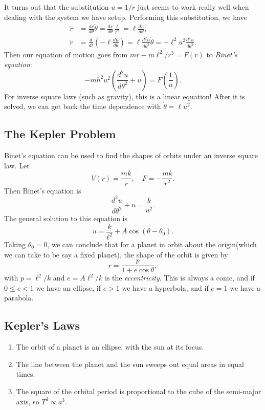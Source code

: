 \documentclass[11pt, a4paper]{scrartcl}
\theoremstyle{definition}
\begin{document}
It turns out that the substitution $u = 1/r$ just seems to work really well when dealing with the system we have setup. Performing this substitution, we have
\begin{align*}
	\dot{r} &= \frac{dr}{d \theta} \dot{\theta} = \frac{dr}{d\theta} \frac{\ell}{r^2} = \ell \frac{du}{d \theta}, \\
	\ddot{r} &= \frac{d}{dt}\left(- \ell \frac{du}{d\theta}\right) = \ell \frac{d^2 u}{d\theta^2}\dot{\theta} = -\ell^2 u^2 \frac{d^2 u}{d \theta^2}.
\end{align*}
Then our equation of motion goes from $m \ddot{r} - m\ell^2/r^3 = F(r)$ to \emph{Binet's equation}:
$$
-mh^2 u^2 \left(\frac{d^2 u }{d \theta^2} + u\right) = F\left(\frac{1}{u}\right).
$$
For inverse square laws (such as gravity), this is a linear equation! After it is solved, we can get back the time dependence with
$\dot{\theta} = \ell u^2$.


\subsection*{The Kepler Problem}

Binet's equation can be used to find the shapes of orbits under an inverse square law. Let
$$
V(r) = \frac{mk}{r}, \quad F = -\frac{mk}{r^2}.
$$
Then Binet's equation is
$$
\frac{d^2 u}{d \theta^2} + u = \frac{k}{u^2}.
$$
The general solution to this equation is
$$
u = \frac{k}{\ell^2} + A \cos(\theta - \theta_0).
$$
Taking $\theta_0 = 0$, we can conclude that for a planet in orbit about the origin(which we can take to be say a fixed planet), the shape of the orbit is given by
$$
r = \frac{p}{1 + e \cos \theta},
$$
with $p = \ell^2/k$ and $e = A \ell^2/k$ is the \emph{eccentricity}. This is always a conic, and if $0 \leq e < 1$ we have an ellipse, if $e > 1$ we have a hyperbola, and if $e = 1$ we have a parabola.

\subsection*{Kepler's Laws}

\begin{enumerate}
	\item The orbit of a planet is an ellipse, with the sun at its focus.
	\item The line between the planet and the sun sweeps out equal areas in equal times.
	\item The square of the orbital period is proportional to the cube of the semi-major axis, so $T^3 \propto a^3$.
\end{enumerate}
\end{document}
